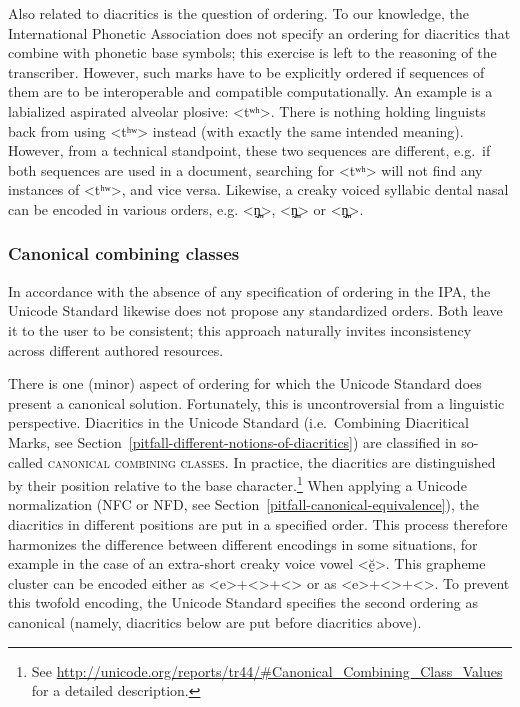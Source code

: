 Also related to diacritics is the question of ordering. To our knowledge, the
International Phonetic Association does not specify an ordering for
diacritics that combine with phonetic base symbols; this exercise is left to the
reasoning of the transcriber. However, such marks have to be explicitly ordered
if sequences of them are to be interoperable and compatible computationally. An example is a
labialized aspirated alveolar plosive: <tʷʰ>. There is nothing holding linguists
back from using <tʰʷ> instead (with exactly the same intended meaning). However,
from a technical standpoint, these two sequences are different, e.g.~if both
sequences are used in a document, searching for <tʷʰ> will not find any
instances of <tʰʷ>, and vice versa. Likewise, a creaky voiced syllabic dental
nasal can be encoded in various orders, e.g. <n̪̰̩>, <n̩̰̪> or <n̩̪̰>.

\subsubsection*{Canonical combining classes}

In accordance with the absence of any specification of ordering in the IPA, the
Unicode Standard likewise does not propose any standardized orders. Both leave it
to the user to be consistent; this approach naturally invites inconsistency across 
different authored resources.

There is one (minor) aspect of ordering for which the Unicode Standard does
present a canonical solution. Fortunately, this is uncontroversial from a
linguistic perspective. Diacritics in the Unicode Standard (i.e.~Combining
Diacritical Marks, see Section~\ref{pitfall-different-notions-of-diacritics})
are classified in so-called \textsc{canonical combining classes}. In practice,
the diacritics are distinguished by their position relative to the base
character.\footnote{See
\url{http://unicode.org/reports/tr44/\#Canonical\_Combining\_Class\_Values} for
a detailed description.} When applying a Unicode normalization (NFC or NFD, see
Section~\ref{pitfall-canonical-equivalence}), the diacritics in different
positions are put in a specified order. This process therefore harmonizes the
difference between different encodings in some situations, for example in the
case of an extra-short creaky voice vowel <ḛ̆>. This grapheme cluster can be
encoded either as <e>+<>+<> or as
<e>+<>+<>. To prevent this twofold encoding, the Unicode
Standard specifies the second ordering as canonical (namely, diacritics
below are put before diacritics above).

